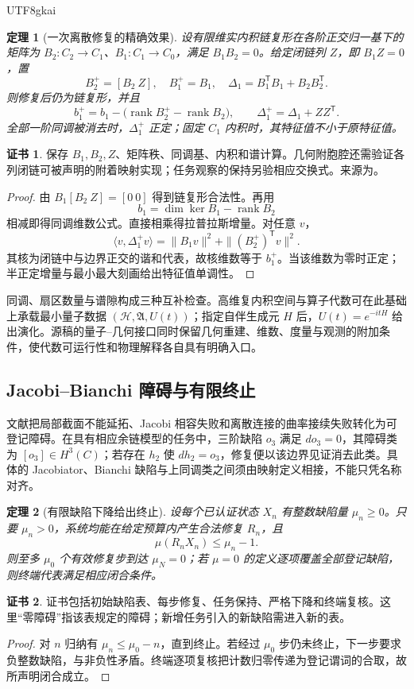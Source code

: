 \documentclass[11pt,a4paper]{article}
\theoremstyle{plain}
\newtheorem{theorem}{定理}[section]
\theoremstyle{definition}
\newtheorem*{certificate}{证书}
\theoremstyle{remark}
\begin{document}
\begin{CJK*}{UTF8}{gkai}
\begin{theorem}[一次离散修复的精确效果]
\label{ss:cell-repair}
设有限维实内积链复形在各阶正交归一基下的矩阵为 $B_2:C_2\to C_1$、$B_1:C_1\to C_0$，满足 $B_1B_2=0$。给定闭链列 $Z$，即 $B_1Z=0$，置
\[
 B_2^+=[B_2\ Z],\quad B_1^+=B_1,
 \quad \Delta_1=B_1^{\mathsf T}B_1+B_2B_2^{\mathsf T}.
\]
则修复后仍为链复形，并且
\[
 b_1^+=b_1-\bigl(\operatorname{rank}B_2^+-\operatorname{rank}B_2\bigr),
 \qquad \Delta_1^+=\Delta_1+ZZ^{\mathsf T}.
\]
全部一阶同调被消去时，$\Delta_1^+$ 正定；固定 $C_1$ 内积时，其特征值不小于原特征值。
\end{theorem}
\begin{certificate}
保存 $B_1,B_2,Z$、矩阵秩、同调基、内积和谱计算。几何附胞腔还需验证各列闭链可被声明的附着映射实现；任务观察的保持另验相应交换式。来源为\cite{S21}。
\end{certificate}
\begin{proof}
由 $B_1[B_2\ Z]=[0\ 0]$ 得到链复形合法性。再用
\[
 b_1=\dim\ker B_1-\operatorname{rank}B_2
\]
相减即得同调维数公式。直接相乘得拉普拉斯增量。对任意 $v$，
\[
 \langle v,\Delta_1^+v\rangle
 =\|B_1v\|^2+\|(B_2^+)^{\mathsf T}v\|^2.
\]
其核为闭链中与边界正交的谐和代表，故核维数等于 $b_1^+$。当该维数为零时正定；半正定增量与最小最大刻画给出特征值单调性。
\end{proof}

同调、扇区数量与谱隙构成三种互补检查。高维复内积空间与算子代数可在此基础上承载最小量子数据 $(\mathcal H,\mathfrak A,U(t))$；指定自伴生成元 $H$ 后，$U(t)=e^{-itH}$ 给出演化。源稿的量子--几何接口同时保留几何重建、维数、度量与观测的附加条件，使代数可运行性和物理解释各自具有明确入口。

\subsection{Jacobi--Bianchi 障碍与有限终止}

文献\cite{S23,S24}把局部截面不能延拓、Jacobi 相容失败和离散连接的曲率接续失败转化为可登记障碍。在具有相应余链模型的任务中，三阶缺陷 $o_3$ 满足 $do_3=0$，其障碍类为 $[o_3]\in H^3(C)$；若存在 $h_2$ 使 $dh_2=o_3$，修复便以该边界见证消去此类。具体的 Jacobiator、Bianchi 缺陷与上同调类之间须由映射定义相接，不能只凭名称对齐。

\begin{theorem}[有限缺陷下降给出终止]
\label{ss:termination}
设每个已认证状态 $X_n$ 有整数缺陷量 $\mu_n\ge0$。只要 $\mu_n>0$，系统均能在给定预算内产生合法修复 $R_n$，且
\[
 \mu(R_nX_n)\le\mu_n-1.
\]
则至多 $\mu_0$ 个有效修复步到达 $\mu_N=0$；若 $\mu=0$ 的定义逐项覆盖全部登记缺陷，则终端代表满足相应闭合条件。
\end{theorem}
\begin{certificate}
证书包括初始缺陷表、每步修复、任务保持、严格下降和终端复核。这里“零障碍”指该表规定的障碍；新增任务引入的新缺陷需进入新的表。
\end{certificate}
\begin{proof}
对 $n$ 归纳有 $\mu_n\le\mu_0-n$，直到终止。若经过 $\mu_0$ 步仍未终止，下一步要求负整数缺陷，与非负性矛盾。终端逐项复核把计数归零传递为登记谓词的合取，故所声明闭合成立。
\end{proof}


\end{CJK*}
\end{document}

